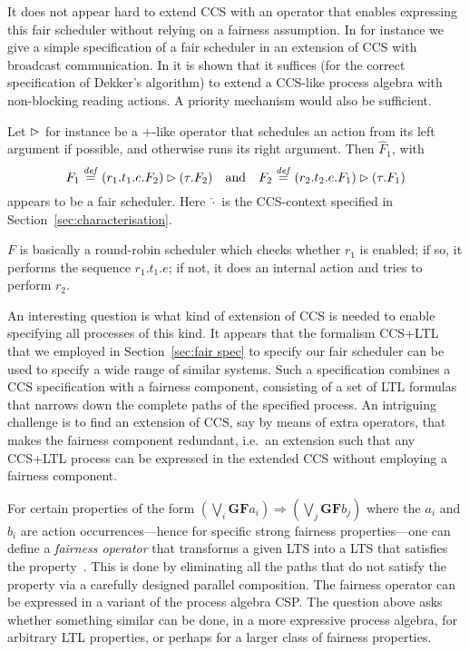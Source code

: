 \documentclass[smallcondensed]{svjour3}
\newcommand{\Sect}[1]{Section~\ref{sec:#1}}
\begin{document}
It does not appear hard to extend CCS with an operator that enables expressing this fair
scheduler without relying on a fairness assumption.
In \cite{GH14} for instance we give a simple specification of a fair scheduler in an extension of
CCS with broadcast communication. In \cite{CDV09} it is shown that it suffices (for the correct specification
of Dekker's algorithm) to extend a CCS-like process algebra with non-blocking reading actions.
A priority mechanism \cite{CLN01} would also be sufficient.

Let $\mathbin{\rhd}$ for instance be a +-like operator that schedules an action from its left argument if
possible, and otherwise runs its right argument. Then $\widehat F_1$, with
\[
F_1\stackrel{\it def}{=} (r_1.t_1.e.F_2) \mathbin{\rhd} (\tau.F_2)\quad\mbox{and}\quad
F_2\stackrel{\it def}{=} (r_2.t_2.e.F_1) \mathbin{\rhd} (\tau.F_1)
\]
appears to be a fair scheduler. Here
$\widehat\cdot$ is the CCS-context specified in \Sect{characterisation}.

$F$ is basically a round-robin scheduler which checks whether $r_1$ is enabled; if so, it performs
the sequence $r_1.t_1.e$; if not, it does an internal action and tries to perform $r_2$.

An interesting question is what kind of extension of CCS is needed to enable specifying all
processes of this kind. It appears that the formalism CCS+LTL that we employed in \Sect{fair spec} to
specify our fair scheduler can be used to specify a wide range of similar systems.
Such a specification combines a CCS specification with a fairness component, consisting
of a set of LTL formulas that narrows down the complete paths of the specified process.
An intriguing challenge is to find an extension of CCS, say by means of extra operators,
that makes the fairness component redundant, i.e.\ an extension such that any CCS+LTL process can be expressed in
the extended CCS without employing a fairness component.


For certain properties of the form $(\bigvee_{i}\mathbf{G}\mathbf{F}a_{i}) \Rightarrow (\bigvee_{j}\mathbf{G}\mathbf{F}b_{j})$
where the $a_i$ and $b_i$ are action occurrences---hence for specific strong fairness properties---one can
define a \emph{fairness operator} that
transforms a given LTS into a LTS that satisfies the property~\cite{PuhakkaValmari01}.
This is done by eliminating all the paths that do not satisfy the property via a carefully designed parallel composition. 
The fairness operator can be expressed in a variant of the process algebra CSP\@.
The question above asks whether something similar can be done, in a more expressive process algebra,
for arbitrary LTL properties, or perhaps for a larger class of fairness properties.
\end{document}
